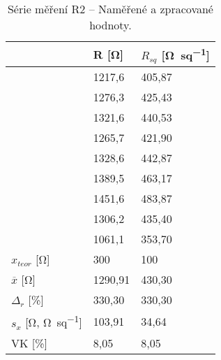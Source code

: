 \begin{table}[h!]
    \caption{Série měření R2 -- Naměřené a zpracované hodnoty.}
    \centering
    \def\arraystretch{1.4}
    \begin{tabular}{l|l|l}
                            & R [\unit{\ohm}]    & \(R_{sq}\) [\unit{\ohm\per sq}]  \\ \hline\hline
                            & 1217,6 & 405,87 \\ \hline
                            & 1276,3 & 425,43 \\ \hline
                            & 1321,6 & 440,53 \\ \hline
                            & 1265,7 & 421,90 \\ \hline
                            & 1328,6 & 442,87 \\ \hline
                            & 1389,5 & 463,17 \\ \hline
                            & 1451,6 & 483,87 \\ \hline
                            & 1306,2 & 435,40 \\ \hline
                            & 1061,1 & 353,70 \\ \hline\hline
        \(x_{teor} \) [\unit{\ohm}]      & 300    & 100    \\ \hline
        \(\overline{x} \) [\unit{\ohm}]  & 1290,91  & 430,30 \\ \hline
        \(\Delta_{r} \) [\unit{\percent}]    &  330,30& 330,30\\ \hline\hline
        \(s_{x} \) [\unit{\ohm}, \unit{\ohm\per sq}]         &  103,91  & 34,64   \\ \hline
        VK [\unit{\percent}]                 &  8,05 & 8,05 \\ 
    \end{tabular}
    \label{tab:r2_hodnoty}
\end{table}

